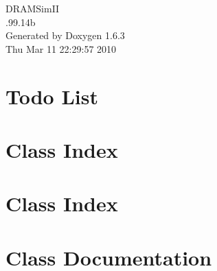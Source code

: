 \documentclass[a4paper]{book}
\begin{document}
\begin{titlepage}
\vspace*{7cm}
\begin{center}
{\Large DRAMSimII \\[1ex]\large .99.14b }\\
\vspace*{1cm}
{\large Generated by Doxygen 1.6.3}\\
\vspace*{0.5cm}
{\small Thu Mar 11 22:29:57 2010}\\
\end{center}
\end{titlepage}
\clearemptydoublepage
{}
\tableofcontents
\clearemptydoublepage
{}
\chapter{Todo List}
\label{todo}

\chapter{Class Index}

\chapter{Class Index}

\chapter{Class Documentation}





















\printindex
\end{document}
